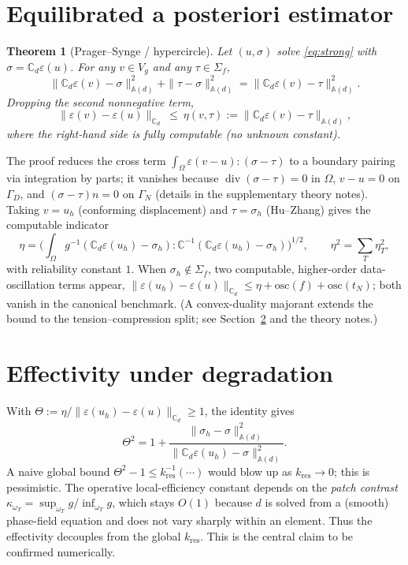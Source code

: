 \documentclass[11pt]{article}
\newtheorem{theorem}{Theorem}
\newcommand{\Om}{\Omega}
\newcommand{\eps}{\varepsilon}
\newcommand{\dv}{\operatorname{div}}
\newcommand{\CC}{\mathbb{C}}
\newcommand{\Cd}{\mathbb{C}_d}
\newcommand{\Ad}{\mathbb{A}(d)}
\newcommand{\GN}{\Gamma_N}
\newcommand{\GD}{\Gamma_D}
\newcommand{\kres}{k_{\mathrm{res}}}
\newcommand{\osc}{\mathrm{osc}}
\begin{document}
\section{Equilibrated a posteriori estimator}\label{sec:est}
\begin{theorem}[Prager--Synge / hypercircle]\label{thm:ps}
Let $(u,\sigma)$ solve \eqref{eq:strong} with $\sigma=\Cd\eps(u)$. For any
$v\in V_g$ and any $\tau\in\Sigma_f$,
\begin{equation}
\|\Cd\eps(v)-\sigma\|_{\Ad}^2+\|\tau-\sigma\|_{\Ad}^2
=\|\Cd\eps(v)-\tau\|_{\Ad}^2 .
\end{equation}
Dropping the second nonnegative term,
\begin{equation}
\|\eps(v)-\eps(u)\|_{\Cd}\ \le\ \eta(v,\tau):=\|\Cd\eps(v)-\tau\|_{\Ad},
\label{eq:reliab}
\end{equation}
where the right-hand side is fully computable (no unknown constant).
\end{theorem}
The proof reduces the cross term $\int_\Om\eps(v-u):(\sigma-\tau)$ to a boundary
pairing via integration by parts; it vanishes because $\dv(\sigma-\tau)=0$ in
$\Om$, $v-u=0$ on $\GD$, and $(\sigma-\tau)n=0$ on $\GN$ (details in the
supplementary theory notes). Taking $v=u_h$ (conforming displacement) and
$\tau=\sigma_h$ (Hu--Zhang) gives the computable indicator
\begin{equation}
\eta=\Big(\int_\Om g^{-1}(\Cd\eps(u_h)-\sigma_h):\CC^{-1}(\Cd\eps(u_h)-\sigma_h)\Big)^{1/2},
\qquad \eta^2=\sum_T\eta_T^2,
\label{eq:eta}
\end{equation}
with reliability constant $1$. When $\sigma_h\notin\Sigma_f$, two computable,
higher-order data-oscillation terms appear,
$\|\eps(u_h)-\eps(u)\|_{\Cd}\le\eta+\osc(f)+\osc(t_N)$; both vanish in the
canonical benchmark. (A convex-duality majorant extends the bound to the
tension--compression split; see Section~\ref{sec:eff} and the theory notes.)

\section{Effectivity under degradation}\label{sec:eff}
With $\Theta:=\eta/\|\eps(u_h)-\eps(u)\|_{\Cd}\ge1$, the identity gives
\begin{equation}
\Theta^2=1+\frac{\|\sigma_h-\sigma\|_{\Ad}^2}{\|\Cd\eps(u_h)-\sigma\|_{\Ad}^2}.
\label{eq:theta}
\end{equation}
A naive global bound $\Theta^2-1\le\kres^{-1}(\cdots)$ would blow up as
$\kres\to0$; this is pessimistic. The operative local-efficiency constant
depends on the \emph{patch contrast}
$\kappa_{\omega_T}=\sup_{\omega_T}g/\inf_{\omega_T}g$, which stays $O(1)$
because $d$ is solved from a (smooth) phase-field equation and does not vary
sharply within an element. Thus the effectivity decouples from the global
$\kres$. This is the central claim to be confirmed numerically.
\end{document}
